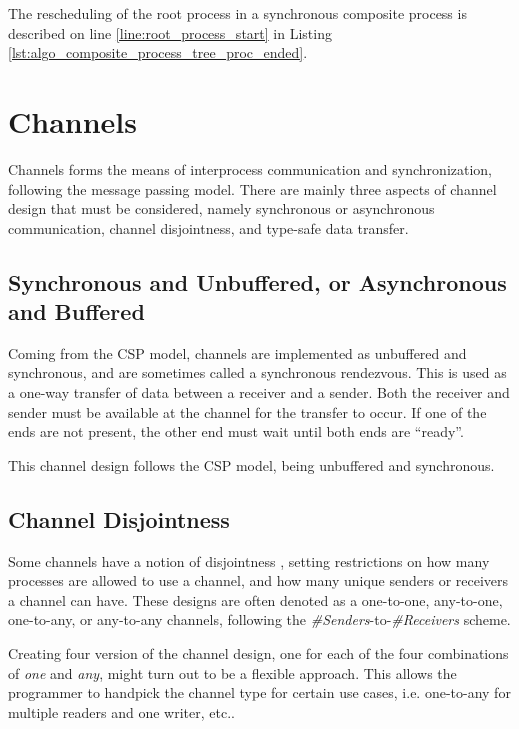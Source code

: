 The rescheduling of the root process in a synchronous composite process is described on line \ref{line:root_process_start} in Listing \ref{lst:algo_composite_process_tree_proc_ended}.


\section{Channels}
\label{sec:channels}

Channels forms the means of interprocess communication and synchronization, following the message passing model. There are mainly three aspects of channel design that must be considered, namely synchronous or asynchronous communication, channel disjointness, and type\hyp{}safe data transfer. 

\subsection{Synchronous and Unbuffered, or Asynchronous and Buffered}

Coming from the CSP model, channels are implemented as unbuffered and synchronous, and are sometimes called a synchronous rendezvous. This is used as a one\hyp{}way transfer of data between a receiver and a sender. Both the receiver and sender must be available at the channel for the transfer to occur. If one of the ends are not present, the other end must wait until both ends are ``ready''.

This channel design follows the CSP model, being unbuffered and synchronous.

\subsection{Channel Disjointness}

Some channels have a notion of disjointness \citep[see][chapter 3.3.1]{xc}, setting restrictions on how many processes are allowed to use a channel, and how many unique senders or receivers a channel can have. These designs are often denoted as a one\hyp{}to\hyp{}one, any\hyp{}to\hyp{}one, one\hyp{}to\hyp{}any, or any\hyp{}to\hyp{}any channels, following the \textit{\#Senders}\hyp{}to\hyp{}\textit{\#Receivers} scheme.

Creating four version of the channel design, one for each of the four combinations of \textit{one} and \textit{any}, might turn out to be a flexible approach. This allows the programmer to handpick the channel type for certain use cases, i.e.  one\hyp{}to\hyp{}any for multiple readers and one writer, etc.. 

